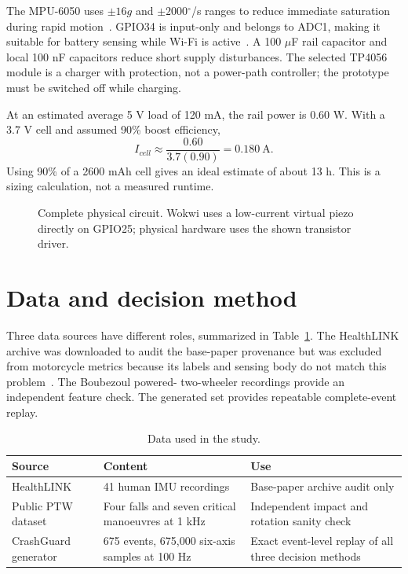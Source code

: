 \documentclass[12pt,a4paper]{article}
\newcommand{\degree}{\ensuremath{^{\circ}}}
\begin{document}
The MPU-6050 uses $\pm16g$ and $\pm2000\degree$/s ranges to reduce immediate
saturation during rapid motion~\cite{mpu6050datasheet}. GPIO34 is input-only
and belongs to ADC1, making it suitable for battery sensing while Wi-Fi is
active~\cite{esp32datasheet}. A 100 $\mu$F rail capacitor and local 100 nF
capacitors reduce short supply disturbances. The selected TP4056 module is a
charger with protection, not a power-path controller; the prototype must be
switched off while charging.

At an estimated average 5 V load of 120 mA, the rail power is 0.60 W. With a
3.7 V cell and assumed 90\% boost efficiency,
\begin{equation}
 I_{cell}\approx\frac{0.60}{3.7(0.90)}=0.180\ \mathrm{A}.
\end{equation}
Using 90\% of a 2600 mAh cell gives an ideal estimate of about 13 h. This is a
sizing calculation, not a measured runtime.

\begin{landscape}
\begin{figure}[p]
\centering
\resizebox{0.94\linewidth}{!}{}
\caption{Complete physical circuit. Wokwi uses a low-current virtual piezo
directly on GPIO25; physical hardware uses the shown transistor driver.}
\label{fig:circuit}
\end{figure}
\end{landscape}

\section{Data and decision method}

Three data sources have different roles, summarized in Table~\ref{tab:data}.
The HealthLINK archive was downloaded to audit the base-paper provenance but
was excluded from motorcycle metrics because its labels and sensing body do
not match this problem~\cite{healthlinkarchive}. The Boubezoul powered-
two-wheeler recordings provide an independent feature check. The generated
set provides repeatable complete-event replay.

\begin{table}[H]
\centering
\small
\caption{Data used in the study.}
\label{tab:data}
\begin{tabularx}{\textwidth}{@{}p{}p{}X@{}}
\toprule
Source & Content & Use \\
\midrule
HealthLINK & 41 human IMU recordings & Base-paper archive audit only \\
Public PTW dataset & Four falls and seven critical manoeuvres at 1 kHz &
Independent impact and rotation sanity check \\
CrashGuard generator & 675 events, 675,000 six-axis samples at 100 Hz & Exact
event-level replay of all three decision methods \\
\bottomrule
\end{tabularx}
\end{table}
\end{document}
